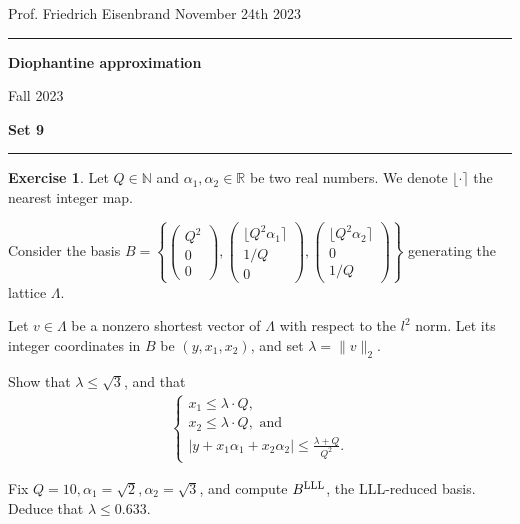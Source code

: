 \documentclass[12pt,a4paper]{article}
\date{}
\theoremstyle{plain}
\newtheorem*{Sol*}{Solution}
\theoremstyle{definition}
\newtheorem{Ex}{Exercise}
\def \N {\mathbb N}
\def \R {\mathbb R}
\newcommand{\nint}[1]{\ensuremath{\lfloor#1\rceil}}
\newif\ifsolutions
\newcommand{\exercise}[2]{
			\begin{Ex} #1 \end{Ex}
			\ifsolutions  \begin{Sol*} #2 \end{Sol*} \bigskip \else \bigskip  \fi
		}
\begin{document}
\begin{center}
{Prof. Friedrich Eisenbrand \hfill November 24th 2023}
\end{center}
	
\hrule\vspace{\baselineskip}

\begin{center}
\textbf{Diophantine approximation}

Fall 2023

\bigskip

\textbf{Set 9}
\ifsolutions{\textbf{- Solutions}} \else{} \fi
\end{center}

\hrule\vspace{\baselineskip}




\exercise{
	Let $Q \in \N$ and $\alpha_1, \alpha_2 \in \R$ be two real numbers. We denote $\nint{ \cdot }$ the nearest integer map.

	Consider the basis $B = \left\{ \begin{pmatrix} Q^2 \\ 0 \\ 0 \end{pmatrix}, \begin{pmatrix} \nint{Q^2 \alpha_1} \\ 1/Q \\ 0 \end{pmatrix}, \begin{pmatrix} \nint{Q^2 \alpha_2} \\ 0 \\ 1/Q \end{pmatrix} \right\}$ generating the lattice $\Lambda$.
	
	Let  $v \in \Lambda$ be a nonzero shortest vector of $\Lambda$ with respect to the $l^2$ norm. 
	Let its integer coordinates in $B$ be $(y, x_1, x_2)$, and set $\lambda = \| v \|_2$.

	Show that $\lambda \leq \sqrt{3}$, and that
	\begin{align*}
	\begin{cases}
		x_1 \leq \lambda \cdot Q, \\
		x_2 \leq \lambda \cdot Q,  \text{ and }\\
		| y + x_1 \alpha_1 + x_2 \alpha_2 | \leq \frac{\lambda + Q}{Q^2}.
	\end{cases}
	\end{align*}
	
	Fix $Q=10, \alpha_1 = \sqrt{2}, \alpha_2 = \sqrt{3}$, and compute $B^{{\rm LLL}}$, the LLL-reduced basis.
	Deduce that $\lambda \leq 0.633$.
}
{}
\end{document}
